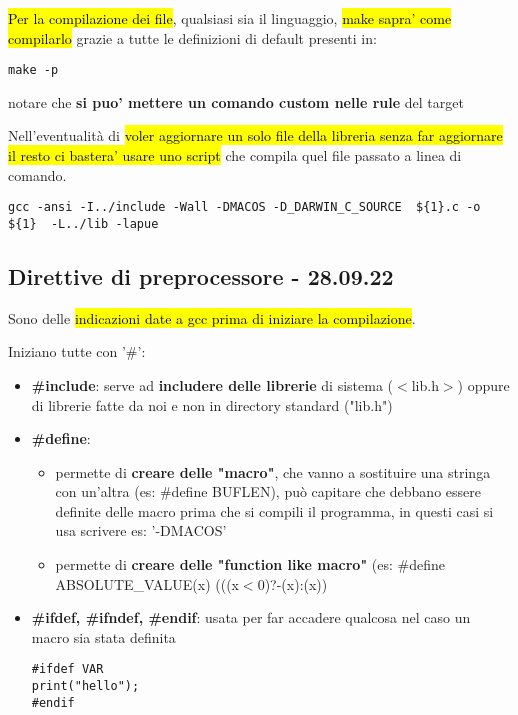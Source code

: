 \hl{Per la compilazione dei file}, qualsiasi sia il linguaggio, \hl{make sapra' come compilarlo} grazie a tutte le definizioni di default presenti in:

\begin{lstlisting}
make -p
\end{lstlisting}

notare che \textbf{si puo' mettere un comando custom nelle rule} del target

Nell'eventualità di \hl{voler aggiornare un solo file della libreria senza far aggiornare il resto ci bastera' usare uno script} che compila quel file passato a linea di comando.

\begin{lstlisting}
gcc -ansi -I../include -Wall -DMACOS -D_DARWIN_C_SOURCE  ${1}.c -o ${1}  -L../lib -lapue
\end{lstlisting}



\subsection{Direttive di preprocessore - 28.09.22}
Sono delle \hl{indicazioni date a gcc prima di iniziare la compilazione}.

Iniziano tutte con '\#':
\begin{itemize}
	\item \textbf{\#include}: serve ad \textbf{includere delle librerie} di sistema ($<$lib.h$>$) oppure di librerie fatte da noi e non in directory standard ("lib.h")
	\item \textbf{\#define}:
		\begin{itemize}
			\item permette di \textbf{creare delle "macro"}, che vanno a sostituire una stringa con un'altra (es: \#define BUFLEN), può capitare che debbano essere definite delle macro prima che si compili il programma, in questi casi si usa scrivere es: '-DMACOS'
			\item permette di \textbf{creare delle "function like macro"} (es: \#define ABSOLUTE\_VALUE(x) (((x$<$0)?-(x):(x))  
		\end{itemize}
		
	\item \textbf{\#ifdef, \#ifndef, \#endif}: usata per far accadere qualcosa nel caso un macro sia stata definita
\begin{lstlisting}
#ifdef VAR
print("hello");
#endif
\end{lstlisting}

\end{itemize} 

